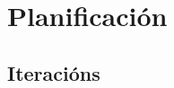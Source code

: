 \chapter[Planificación]{
  \label{chp:plan}
  Planificación
}
\minitoc
\newpage

\section{Iteracións}
